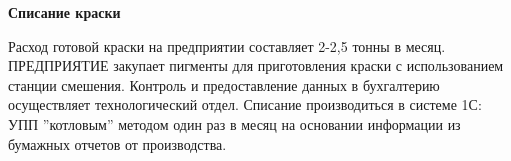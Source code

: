 \textbf{Списание краски}

Расход готовой краски на предприятии составляет 2-2,5 тонны в месяц. ПРЕДПРИЯТИЕ закупает пигменты для приготовления краски с использованием станции смешения. Контроль и предоставление данных в бухгалтерию осуществляет технологический отдел. Списание производиться в системе 1С: УПП ''котловым'' методом  один раз в месяц на  основании информации из бумажных отчетов от производства.













